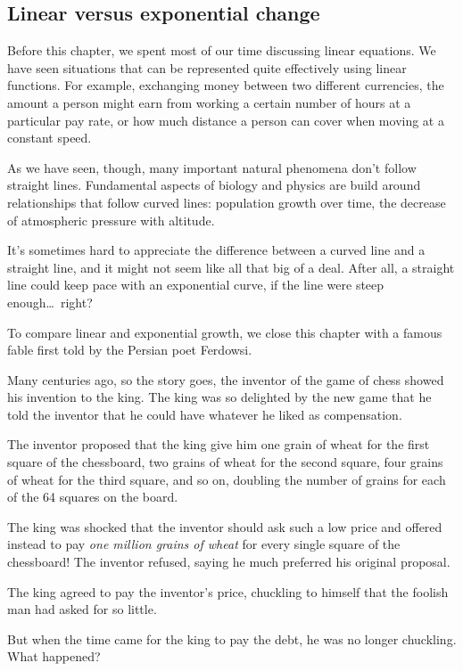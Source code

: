 \subsection{Linear versus exponential change}

Before this chapter, we spent most of our time discussing linear equations. We have seen situations that can be represented quite effectively using linear functions. For example, exchanging money between two different currencies, the amount a person might earn from working a certain number of hours at a particular pay rate, or how much distance a person can cover when moving at a constant speed.

As we have seen, though, many important natural phenomena don't follow straight lines. Fundamental aspects of biology and physics are build around relationships that follow curved lines: population growth over time, the decrease of atmospheric pressure with altitude.

It's sometimes hard to appreciate the difference between a curved line and a straight line, and it might not seem like all that big of a deal. After all, a straight line could keep pace with an exponential curve, if the line were steep enough\ldots\ right?

To compare linear and exponential growth, we close this chapter with a famous fable first told by the Persian poet Ferdowsi.

\begin{boxexplore}
Many centuries ago, so the story goes, the inventor of the game of chess showed his invention to the king. The king was so delighted by the new game that he told the inventor that he could have whatever he liked as compensation.

The inventor proposed that the king give him one grain of wheat for the first square of the chessboard, two grains of wheat for the second square, four grains of wheat for the third square, and so on, doubling the number of grains for each of the 64 squares on the board.

The king was shocked that the inventor should ask such a low price and offered instead to pay \textit{one million grains of wheat} for every single square of the chessboard! The inventor refused, saying he much preferred his original proposal.

The king agreed to pay the inventor's price, chuckling to himself that the foolish man had asked for so little.

But when the time came for the king to pay the debt, he was no longer chuckling. What happened?
\end{boxexplore}

